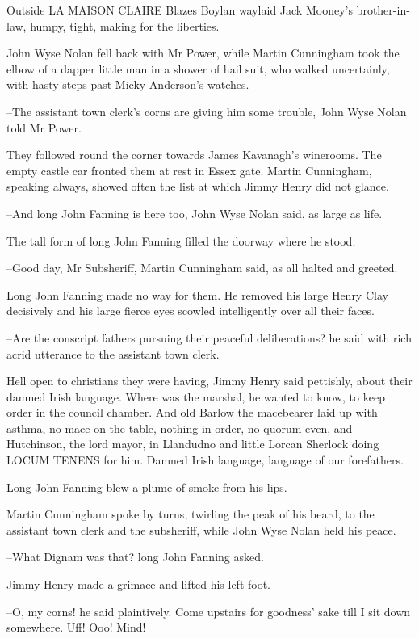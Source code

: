 Outside LA MAISON CLAIRE
Blazes Boylan waylaid Jack Mooney's brother-in-
law,
humpy, tight,
making for the liberties.

John Wyse Nolan fell back with Mr Power,
while Martin Cunningham took the
elbow of a dapper little man in a shower of hail suit,
who walked
uncertainly,
with hasty steps past Micky Anderson's watches.

--The assistant town clerk's corns are giving him some trouble,
John Wyse Nolan told Mr Power.%

They followed round the corner
towards James Kavanagh's winerooms.
The
empty castle car fronted them at rest in Essex gate.
Martin Cunningham,
speaking always,
showed often the list at which Jimmy Henry did not
glance.

--And long John Fanning is here too,
John Wyse Nolan said,
as large as
life.

The tall form of long John Fanning
filled the doorway where he stood.

--Good day, Mr Subsheriff,
Martin Cunningham said,
as all halted and greeted.%

Long John Fanning made no way for them.
He removed his large Henry Clay decisively
and his large fierce eyes scowled intelligently over all their faces.

--Are the conscript fathers pursuing their peaceful deliberations?
he said with rich acrid utterance
to the assistant town clerk.

Hell open to christians they were having,
Jimmy Henry said pettishly,
about their damned Irish language.
Where was the marshal,
he wanted to
know,
to keep order in the council chamber.
And old Barlow the macebearer
laid up with asthma,
no mace on the table,
nothing in order,
no quorum even,
and Hutchinson, the lord mayor, in Llandudno
and little Lorcan
Sherlock doing LOCUM TENENS for him.
Damned Irish language,
language of
our forefathers.

Long John Fanning blew a plume of smoke from his lips.

Martin Cunningham spoke by turns,
twirling the peak of his beard,
to the
assistant town clerk and the subsheriff,
while John Wyse Nolan held his
peace.

--What Dignam was that?
long John Fanning asked.

Jimmy Henry made a grimace and lifted his left foot.

--O, my corns!
he said plaintively.
Come upstairs for goodness' sake till I sit down somewhere.
Uff!
Ooo!
Mind!

